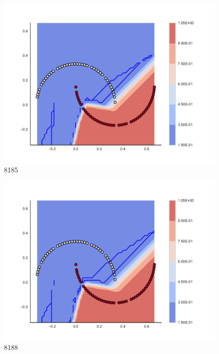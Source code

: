 \begin{subfigure}[b]{0.09\textwidth}
    \includegraphics[clip, trim=2.35cm 1.75cm 4.5cm 0cm,width=\textwidth]{img/convergence/8185.pdf}
    \caption{8185}
    \label{fig:convergence_8185}
\end{subfigure}
%
\begin{subfigure}[b]{0.09\textwidth}
    \includegraphics[clip, trim=2.35cm 1.75cm 4.5cm 0cm,width=\textwidth]{img/convergence/8188.pdf}
    \caption{8188}
    \label{fig:convergence_8188}
\end{subfigure}
%
